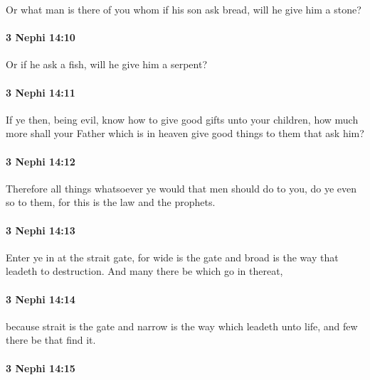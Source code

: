 			Or what man is there of you
			whom if his son ask bread, will he give him a stone?

		\paragraph{3 Nephi 14:10} %
			\label{3NEPHI-14-10}

			Or if he ask a fish, will he give him a serpent?

		\paragraph{3 Nephi 14:11} %
			\label{3NEPHI-14-11}

			If ye then, being evil, know how to give good gifts unto your children,
			how much more shall your Father which is in heaven
			give good things to them that ask him?

		\paragraph{3 Nephi 14:12} %
			\label{3NEPHI-14-12}

			Therefore all things whatsoever ye would that men should do to you,
			do ye even so to them,
			for this is the law and the prophets.

		\paragraph{3 Nephi 14:13} %
			\label{3NEPHI-14-13}

			Enter ye in at the strait gate,
			for wide is the gate and broad is the way that leadeth to destruction.
			And many there be which go in thereat,

		\paragraph{3 Nephi 14:14} %
			\label{3NEPHI-14-14}

			because strait is the gate and narrow is the way which leadeth unto life,
			and few there be that find it.

		\paragraph{3 Nephi 14:15} %
			\label{3NEPHI-14-15}

